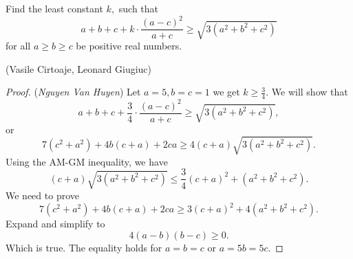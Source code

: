 \documentclass[12pt,a4paper]{book}
\begin{document}
\begin{pro_no_count}
Find the least constant $k,$ such that
$$a+b+c+k\cdot\frac{(a-c)^2}{a+c}\geq \sqrt{3(a^2+b^2+c^2)}$$
for all $a\ge b\ge c$ be positive real numbers.
\begin{flushright}(Vasile Cirtoaje, Leonard Giugiuc)\end{flushright}
\end{pro_no_count}

\begin{proof} (\textit{Nguyen Van Huyen}) Let $a=5,b=c=1$ we get $k \geqslant \frac34.$ We will show that
$$a+b+c+\frac34\cdot\frac{\left(a-c\right)^2}{a+c}\geq\sqrt{3\left(a^2+b^2+c^2\right)},$$
or
\[7(c^2+a^2)+4b(c+a)+2ca \geqslant 4(c+a)\sqrt{3(a^2+b^2+c^2)}.\]
Using the AM-GM inequality, we have
\[(c+a)\sqrt{3(a^2+b^2+c^2)} \leqslant \frac34(c+a)^2+(a^2+b^2+c^2).\]
We need to prove
\[7(c^2+a^2)+4b(c+a)+2ca \geqslant 3(c+a)^2 + 4(a^2+b^2+c^2).\]
Expand and simplify to
\[4(a-b)(b-c) \geqslant 0.\]
Which is true. The equality holds for $a=b=c$ or $a=5b=5c.$
\end{proof}
\end{document}
